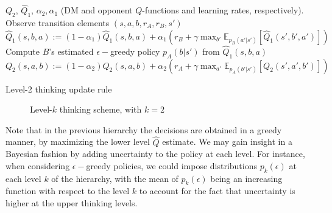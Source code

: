 \begin{algorithm*}[!ht]
\begin{algorithmic}[1]
\Require $Q_2$, $\hat{Q}_1$, $\alpha_2, \alpha_1$ (DM and opponent $Q$-functions
and learning rates, respectively).
\State Observe  transition elements $(s, a, b, r_A, r_B, s')$ 
\State $\hat{Q}_1(s,b,a) := (1 - \alpha_1)\hat{Q}_1(s,b,a)  + \alpha_1 (r_B + \gamma \max_{b'} \mathbb{E}_{p_B(a'|s')} \left[ \hat{Q}_1(s',b', a') \right] )$ 
\State Compute $B$'s estimated $\epsilon-$greedy policy $p_A(b|s')$ from $\hat{Q}_1(s,b,a)$
\State $Q_2(s,a,b) := (1 - \alpha_2)Q_2(s,a,b) + \alpha_2 (r_A + \gamma \max_{a'} \mathbb{E}_{p_A(b'|s')} \left[ Q_2(s',a',b') \right]) $ 
\end{algorithmic}
\caption{Level-2 thinking update rule}
\label{alg:l2ur}
\end{algorithm*}

\begin{figure}[!ht]
\centering
{}
\caption{Level-$k$ thinking scheme, with $k=2$}\label{fig:lev2_scheme}
\end{figure}

Note that in the previous hierarchy the decisions are obtained 
in a greedy manner, by maximizing the lower level
$\hat{Q}$ estimate. We may gain insight in a Bayesian fashion by adding uncertainty to the policy at each level. For instance, 
when considering $\epsilon-$greedy policies,
we could impose distributions $p_k(\epsilon)$ at each level $k$ of the hierarchy,
with the mean of $p_k(\epsilon)$ being an increasing function with respect to 
the level $k$ to account for the fact that uncertainty is higher
at the upper thinking levels. 

